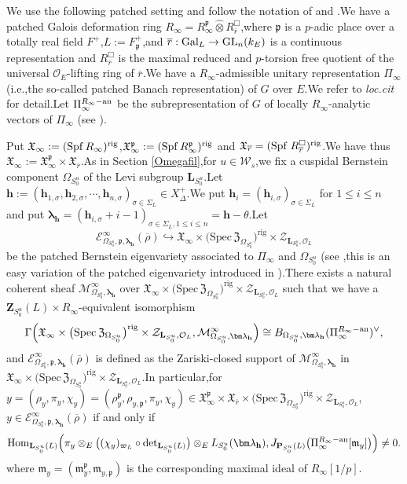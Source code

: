 \documentclass[10pt]{article}
\DeclareMathOperator{\Spf}{Spf}
\newcommand{\rig}{{\rm rig}}
\newcommand{\gal}{{\rm Gal}}
\newcommand{\homo}{{\rm Hom}}
\newcommand{\GLN}{{\rm GL}}
\newcommand{\ana}{{\rm an}}
\newcommand{\spf}{{\rm Spf}}
\newcommand{\hpi}{{{\mathbf{h}}}}
\newcommand{\sbanpiku}{{\big(\mathrm{Spec}\hspace{2pt}\FZ_{\Omega_{S^u_0}}\big)^{\mathrm{rig}}}}
\newcommand{\rigchu}{{\mathcal{Z}_{\bL_{S^u_0},\mathcal{O}_L}}}
\newcommand{\omepik}{\Omega_{S^u_0}}
\newcommand{\defvarring}{{R_{\overline{r}}^\Box}}
\newcommand{\bL}{{\mathbf{L}}}
\newcommand{\bP}{{\mathbf{P}}}
\newcommand{\bZ}{{\mathbf{Z}}}
\newcommand{\bh}{{\mathbf{h}}}
\newcommand{\co}{\mathcal O}
\newcommand{\cM}{\mathcal M}
\newcommand{\FX}{{\mathfrak{X}}}
\newcommand{\FZ}{{\mathfrak{Z}}}
\newcommand{\fm}{{\mathfrak{m}}}
\newcommand{\fp}{{\mathfrak{p}}}
\newcommand{\sW}{\mathscr W}
\begin{document}
We use the following patched setting and follow the notation of \cite[Section 4.1.1]{2019DINGSimple} and \cite[Section 2]{PATCHING2016}.\;We have a patched Galois deformation ring $R_{\infty}=R_{\infty}^{\fp}\widehat{\otimes} \defvarring$,\;where $\fp$ is a $p$-adic place over a totally real field $F^+$,\;$L:=F^+_{\fp}$,\;and $\overline{r}: \gal_L \rightarrow \GLN_n(k_E)$ is a continuous representation and  $\defvarring$ is  the maximal reduced and $p$-torsion free quotient of the universal $\co_E$-lifting ring of $\overline{r}$.\;We have a $R_{\infty}$-admissible unitary representation $\Pi_{\infty}$ (i.e.,\;the so-called patched Banach representation) of $G$ over $E$.\;We refer to \textit{loc.cit} for detail.\;Let $\Pi_\infty^{R_\infty-\ana}$ be the subrepresentation of $G$ of locally $R_\infty$-analytic vectors of $\Pi_\infty$ (see \cite[Section 3.1]{breuil2017interpretation}).\;



Put $\FX_{\infty}:=(\Spf R_{\infty})^{\rig}$,\;$\FX_{\infty}^{{\fp}}:=(\Spf R^{\fp}_{\infty})^{\rig}$ and  $\mathfrak{X}_{\overline{r}}=(\spf\;R_{\overline{r}}^{\square})^{\rig}$.\;We have thus
$\FX_{\infty}:=\FX_{\infty}^{{\fp}}\times \mathfrak{X}_{\overline{r}}$.\;As in Section \ref{Omegafil},\;for $u\in\sW_s$,\;we fix a cuspidal Bernstein component $\Omega_{S^u_0}$ of the Levi subgroup $\bL_{S^u_0}$.\;Let $\bh:=(\hpi_{1,\sigma},\hpi_{2,\sigma},\cdots,\hpi_{n,\sigma})_{\sigma\in \Sigma_L}\in X_{\Delta}^+$.\;We put $\hpi_{i}=(\hpi_{i,\sigma})_{\sigma\in \Sigma_L}$ for $1\leq i\leq n$ and put ${\bm\lambda}_\bh=(\hpi_{i,\sigma}+i-1)_{\sigma\in \Sigma_L,1\leq i\leq n}=\bh-\theta$.\;Let 
\[\mathcal{E}_{\omepik,\fp,{\bm\lambda}_\bh}^\infty(\overline{\rho})\hookrightarrow\FX_{\infty}\times\sbanpiku\times \rigchu\] 
be the patched Bernstein eigenvariety associated to $\Pi_{\infty}$ and  $\Omega_{S_0^u}$ (see \cite[Section 4.1]{He20222},\;this is an easy variation of the patched eigenvariety introduced in  \cite{Ding2021}).\;There exists a natural coherent sheaf $\cM_{\omepik,{\bm\lambda}_\bh}^{\infty}$ over $\FX_{\infty}\times\sbanpiku\times \rigchu$ such that we have a $\bZ_{S_0^u}(L)\times R_{\infty}$-equivalent isomorphism
\[\Gamma\Big(\FX_{\infty}\times\sbanpiku\times \rigchu,\cM_{\omepik,{\bm\lambda}_\bh}^{\infty}\Big)\cong B_{\omepik,{\bm\lambda}_\bh}(\Pi_\infty^{R_\infty-\ana})^\vee,\]
and $\mathcal{E}_{\omepik,\fp,{\bm\lambda}_\bh}^\infty(\overline{\rho})$ is
defined as the Zariski-closed support of $\cM_{\omepik,{\bm\lambda}_\bh}^{\infty}$ in $\FX_{\infty}\times\sbanpiku\times \rigchu$.\;In particular,\;for $y=(\rho_y, \pi_{y},\chi_y)=(\rho_{y}^{\fp},\rho_{y,\fp},\pi_{y},\chi_y)\in \FX_{\infty}^{{\fp}}\times \mathfrak{X}_{\overline{r}}\times\sbanpiku\times \rigchu$,\;$y\in \mathcal{E}_{\omepik,\fp,{\bm\lambda}_\bh}^\infty(\overline{\rho})$ if and only if
\[\homo_{\bL_{S^u_0}(L)}\Big(\pi_{y}\otimes_E\big((\chi_y)_{\varpi_{L}}\circ\mathrm{ det}_{\bL_{S^u_0}(L)}\big)\otimes_E L_{S^u_0}({\bm\lambda}_\bh),J_{\bP_{S^u_0}(L)}\big(\Pi_\infty^{R_\infty-\ana}[\fm_y] \big)\Big)\neq0.\]
where $\fm_y=(\fm_y^{\fp},\fm_{y,\fp})$ is the corresponding maximal ideal of $R_{\infty}[1/p]$.\;
\end{document}
